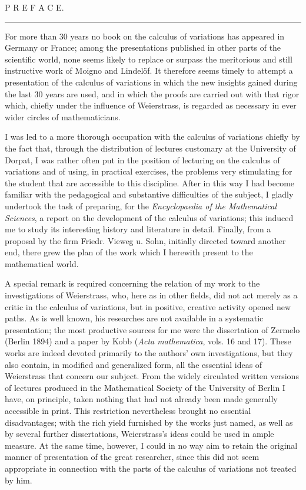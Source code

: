 \documentclass[11pt,a4paper,leqno]{article}
\begin{document}
\begin{center}
{\Large P R E F A C E.}\par
\vspace{2mm}\rule{25mm}{0.4pt}\par
\end{center}

For more than 30 years no book on the calculus of variations has appeared in Germany or France; among the presentations published in other parts of the scientific world, none seems likely to replace or surpass the meritorious and still instructive work of Moigno and Lindelöf. It therefore seems timely to attempt a presentation of the calculus of variations in which the new insights gained during the last 30 years are used, and in which the proofs are carried out with that rigor which, chiefly under the influence of Weierstrass, is regarded as necessary in ever wider circles of mathematicians.

I was led to a more thorough occupation with the calculus of variations chiefly by the fact that, through the distribution of lectures customary at the University of Dorpat, I was rather often put in the position of lecturing on the calculus of variations and of using, in practical exercises, the problems very stimulating for the student that are accessible to this discipline. After in this way I had become familiar with the pedagogical and substantive difficulties of the subject, I gladly undertook the task of preparing, for the \emph{Encyclopaedia of the Mathematical Sciences}, a report on the development of the calculus of variations; this induced me to study its interesting history and literature in detail. Finally, from a proposal by the firm Friedr. Vieweg u. Sohn, initially directed toward another end, there grew the plan of the work which I herewith present to the mathematical world.

A special remark is required concerning the relation of my work to the investigations of Weierstrass, who, here as in other fields, did not act merely as a critic in the calculus of variations, but in positive, creative activity opened new paths. As is well known, his researches are not available in a systematic presentation; the most productive sources for me were the dissertation of Zermelo (Berlin 1894) and a paper by Kobb (\emph{Acta mathematica}, vols. 16 and 17). These works are indeed devoted primarily to the authors' own investigations, but they also contain, in modified and generalized form, all the essential ideas of Weierstrass that concern our subject. From the widely circulated written versions of lectures produced in the Mathematical Society of the University of Berlin I have, on principle, taken nothing that had not already been made generally accessible in print. This restriction nevertheless brought no essential disadvantages; with the rich yield furnished by the works just named, as well as by several further dissertations, Weierstrass's ideas could be used in ample measure. At the same time, however, I could in no way aim to retain the original manner of presentation of the great researcher, since this did not seem appropriate in connection with the parts of the calculus of variations not treated by him.
\end{document}

